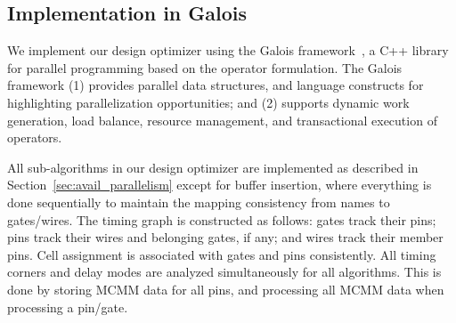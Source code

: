 \subsection{Implementation in Galois}

We implement our design optimizer using the Galois framework~\cite{nguyen:2013,Lenharth:2016}, a C++ library for parallel programming based on the operator formulation. The Galois framework (1) provides parallel data structures, and language constructs for highlighting parallelization opportunities; and (2) supports dynamic work generation, load balance, resource management, and transactional execution of operators.

All sub-algorithms in our design optimizer are implemented as described in Section~\ref{sec:avail_parallelism} except for buffer insertion, where everything is done sequentially to maintain the mapping consistency from names to gates/wires. The timing graph is constructed as follows: gates track their pins; pins track their wires and belonging gates, if any; and wires track their member pins. Cell assignment is associated with gates and pins consistently. All timing corners and delay modes are analyzed simultaneously for all algorithms. This is done by storing MCMM data for all pins, and processing all MCMM data when processing a pin/gate.
